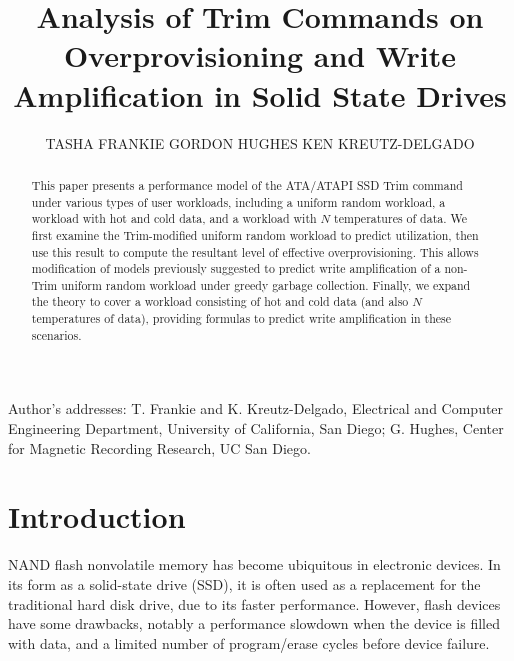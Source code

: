 \documentclass[prodmode,acmtos]{acmsmall}
\begin{document}

\title{Analysis of Trim Commands on Overprovisioning and Write Amplification in Solid State Drives}
\author{TASHA FRANKIE
GORDON HUGHES
KEN KREUTZ-DELGADO
}

\begin{abstract}
This paper presents a performance model of the ATA/ATAPI SSD Trim command under various types of user workloads, including a uniform random workload, a workload with hot and cold data, and a workload with $N$ temperatures of data. We first examine the Trim-modified uniform random workload to predict utilization, then use this result to compute the resultant level of effective overprovisioning. This allows modification of models previously suggested to predict write amplification of a non-Trim uniform random workload under greedy garbage collection.  Finally, we expand the theory to cover a workload consisting of hot and cold data (and also $N$ temperatures of data), providing formulas to predict write amplification in these scenarios.
\end{abstract}







\begin{bottomstuff}

Author's addresses: T. Frankie {and} K. Kreutz-Delgado, Electrical and Computer Engineering Department, University of California, San Diego; G. Hughes, Center for Magnetic Recording Research, UC San Diego.
\end{bottomstuff}

\maketitle


\section{Introduction}
NAND flash nonvolatile memory has become ubiquitous in electronic devices.  In its form as a solid-state drive (SSD), it is often used as a replacement for the traditional hard disk drive, due to its faster performance.  However, flash devices have some drawbacks, notably a performance slowdown when the device is filled with data, and a limited number of program/erase cycles before device failure.
\end{document}
